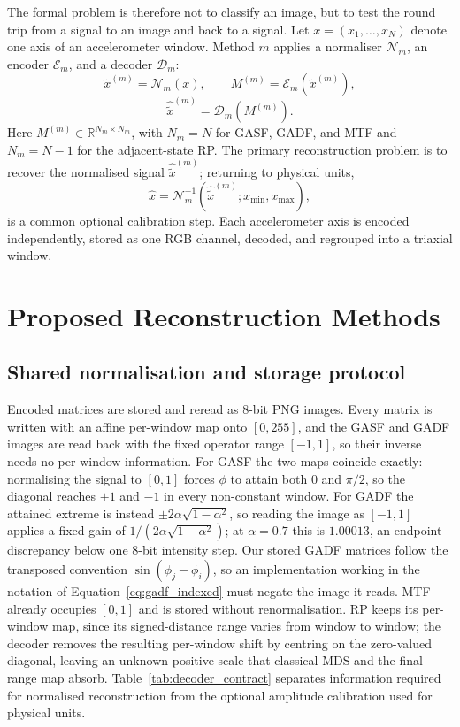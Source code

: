 \documentclass[5p]{elsarticle}
\begin{document}
The formal problem is therefore not to classify an image, but to test the round trip from a signal to an image and back to a signal. Let \(x=(x_1,\ldots,x_N)\) denote one axis of an accelerometer window. Method \(m\) applies a normaliser \(\mathcal N_m\), an encoder \(\mathcal E_m\), and a decoder \(\mathcal D_m\):
\[
\tilde x^{(m)}=\mathcal N_m(x),\qquad
M^{(m)}=\mathcal E_m(\tilde x^{(m)}),
\]
\[
\hat{\tilde x}^{(m)}=\mathcal D_m(M^{(m)}).
\]
Here \(M^{(m)}\in\mathbb R^{N_m\times N_m}\), with \(N_m=N\) for GASF, GADF, and MTF and \(N_m=N-1\) for the adjacent-state RP\@. The primary reconstruction problem is to recover the normalised signal \(\hat{\tilde x}^{(m)}\); returning to physical units,
\[
\hat x=\mathcal N_m^{-1}(\hat{\tilde x}^{(m)};x_{\min},x_{\max}),
\]
is a common optional calibration step. Each accelerometer axis is encoded independently, stored as one RGB channel, decoded, and regrouped into a triaxial window.

\section{Proposed Reconstruction Methods}\label{sec:proposed_methods}

\subsection{Shared normalisation and storage protocol}\label{sec:shared_protocol}

Encoded matrices are stored and reread as 8-bit PNG images. Every matrix is written with an affine per-window map onto \([0,255]\), and the GASF and GADF images are read back with the fixed operator range \([-1,1]\), so their inverse needs no per-window information. For GASF the two maps coincide exactly: normalising the signal to \([0,1]\) forces \(\phi\) to attain both \(0\) and \(\pi/2\), so the diagonal reaches \(+1\) and \(-1\) in every non-constant window. For GADF the attained extreme is instead \(\pm2\alpha\sqrt{1-\alpha^2}\), so reading the image as \([-1,1]\) applies a fixed gain of \(1/(2\alpha\sqrt{1-\alpha^2})\); at \(\alpha=0.7\) this is \(1.00013\), an endpoint discrepancy below one 8-bit intensity step. Our stored GADF matrices follow the transposed convention \(\sin(\phi_j-\phi_i)\), so an implementation working in the notation of Equation~\ref{eq:gadf_indexed} must negate the image it reads. MTF already occupies \([0,1]\) and is stored without renormalisation. RP keeps its per-window map, since its signed-distance range varies from window to window; the decoder removes the resulting per-window shift by centring on the zero-valued diagonal, leaving an unknown positive scale that classical MDS and the final range map absorb. Table~\ref{tab:decoder_contract} separates information required for normalised reconstruction from the optional amplitude calibration used for physical units.
\end{document}
